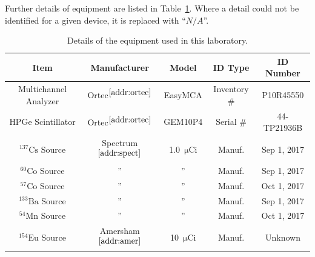\documentclass[12pt]{article}
\newcommand{\micCi}{$\mathrm{\mu Ci}$\xspace}
\newcommand{\CsSrc}{$\mathrm{^{137}Cs}$\xspace}
\newcommand{\MnSrc}{$\mathrm{^{54}Mn}$\xspace}
\newcommand{\CoSrcA}{$\mathrm{^{60}Co}$\xspace}
\newcommand{\CoSrcB}{$\mathrm{^{57}Co}$\xspace}
\newcommand{\BaSrc}{$\mathrm{^{133}Ba}$\xspace}
\newcommand{\EuSrc}{$\mathrm{^{154}Eu}$\xspace}
\begin{document}
\newcommand{\na}{$N/A$}
\newcommand{\sref}[1]{$^{\ref{#1}}$}
\FloatBarrier
Further details of equipment are listed in Table~\ref{tab:equip}.
Where a detail could not be identified for a given device, it is replaced with ``\na''.
\begin{table}[!h]
    \centering
    \small
    \caption{Details of the equipment used in this laboratory.}
    \label{tab:equip}
    \scriptsize
    \begin{tabular}{c|cccc}
        Item & Manufacturer & Model & ID Type & ID Number\\\hline
        Multichannel Analyzer & Ortec\sref{addr:ortec} & EasyMCA & Inventory \# & P10R45550 \\
        HPGe Scintillator & Ortec\sref{addr:ortec} & GEM10P4 & Serial \# & 44-TP21936B \\
        \CsSrc Source & Spectrum\sref{addr:spect} & 1.0~\micCi & Manuf. & Sep 1, 2017 \\
        \CoSrcA Source & '' & '' & Manuf. & Sep 1, 2017 \\
        \CoSrcB Source & '' & '' & Manuf. & Oct 1, 2017 \\
        \BaSrc Source & '' & '' & Manuf. & Sep 1, 2017 \\
        \MnSrc Source & '' & '' & Manuf. & Oct 1, 2017 \\
        \EuSrc Source & Amersham\sref{addr:amer} & 10~\micCi & Manuf. & Unknown \\

\end{tabular}
\end{table}
\end{document}
